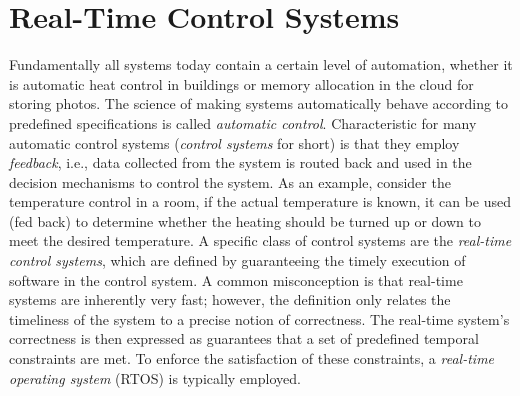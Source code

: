 
\section{Real-Time Control Systems}%
\label{sec:intro:rts}%
%
Fundamentally all systems today contain a certain level of automation, whether it is automatic heat control in buildings or memory allocation in the cloud for storing photos.
The science of making systems automatically behave according to predefined specifications is called \emph{automatic control}.
Characteristic for many automatic control systems (\emph{control systems} for short) is that they employ \emph{feedback}, i.e., data collected from the system is routed back and used in the decision mechanisms to control the system.
As an example, consider the temperature control in a room, if the actual temperature is known, it can be used (fed back) to determine whether the heating should be turned up or down to meet the desired temperature.
A specific class of control systems are the \emph{real-time control systems}, which are defined by guaranteeing the timely execution of software in the control system.
A common misconception is that real-time systems are inherently very fast; however, the definition only relates the timeliness of the system to a precise notion of correctness.
The real-time system's correctness is then expressed as guarantees that a set of predefined temporal constraints are met.
To enforce the satisfaction of these constraints, a \emph{real-time operating system} (RTOS) is typically employed.

